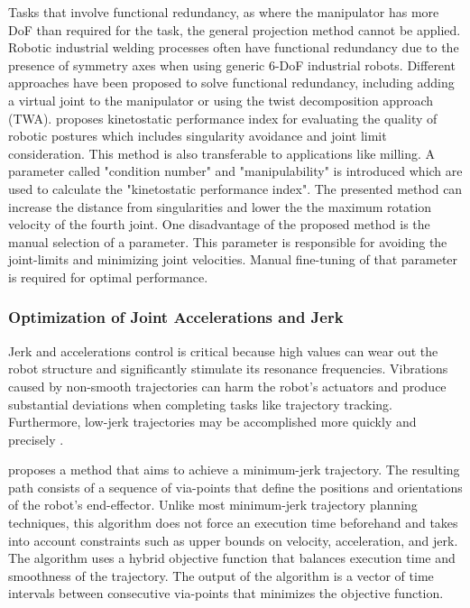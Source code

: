 Tasks that involve functional redundancy, as where the manipulator has more DoF than required for the task, the general projection method cannot be applied. Robotic industrial welding processes often have functional redundancy due to the presence of symmetry axes when using generic 6-DoF industrial robots. Different approaches have been proposed to solve functional redundancy, including adding a virtual joint to the manipulator or using the twist decomposition approach (TWA). \cite{Huo.2008b} proposes kinetostatic performance index for evaluating the quality of robotic postures which includes singularity avoidance and joint limit consideration. This method is also transferable to applications like milling. A parameter called "condition number" and "manipulability" is introduced which are used to calculate the "kinetostatic performance index". The presented method can increase the
distance from singularities and lower the the maximum rotation velocity of the fourth joint. One disadvantage of the proposed method is the manual selection of a parameter. This parameter is responsible for avoiding the joint-limits and minimizing joint velocities. Manual fine-tuning of that parameter is required for optimal performance. 

\subsubsection{Optimization of Joint Accelerations and Jerk}

Jerk and accelerations control is critical because high values can wear out the robot structure and significantly stimulate its resonance frequencies. Vibrations caused by non-smooth trajectories can harm the robot's actuators and produce substantial deviations when completing tasks like trajectory tracking. Furthermore, low-jerk trajectories may be accomplished more quickly and precisely \cite{Gasparetto.2010}.

\cite{Gasparetto.2010} proposes a method that aims to achieve a minimum-jerk trajectory.   
The resulting path consists of a sequence of via-points that define the positions and orientations of the robot's end-effector. Unlike most minimum-jerk trajectory planning techniques, this algorithm does not force an execution time beforehand and takes into account constraints such as upper bounds on velocity, acceleration, and jerk. The algorithm uses a hybrid objective function that balances execution time and smoothness of the trajectory. The output of the algorithm is a vector of time intervals between consecutive via-points that minimizes the objective function. 

